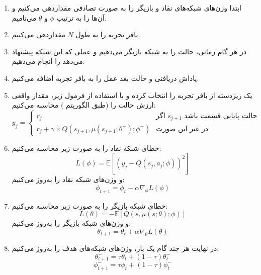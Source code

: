\begin{enumerate}
    \item ابتدا وزن‌های شبکه‌های نقاد و بازیگر را به صورت تصادفی مقداردهی می‌کنیم و آن‌ها را به ترتیب $\phi$ و $\theta$ می‌نامیم.
    \item بافر تجربه را به طول $N$ مقداردهی می‌کنیم.
    \item در هر گام زمانی، حالت را به شبکه بازیگر می‌دهیم و عملی که این شبکه پیشنهاد می‌دهد را انجام می‌دهیم.
    \item پاداش دریافتی و حالت بعد عمل را به بافر تجربه اضافه می‌کنیم.
    \item یک ریزدسته از بافر تجربه را انتخاب کرده و با استفاده از فرمول زیر، مقدار واقعی ارزش حالت را (طبق الگوریتم ) محاسبه می‌کنیم:
    \begin{equation}\label{ddpg_label}
        y_j = \begin{cases}
            r_j & \text{اگر $s_{j+1}$ حالت پایانی قسمت باشد} \\
            r_j + \gamma \times Q(s_{j+1}, \mu(s_{j+1}; \theta^-); \phi^-) & \text{در غیر این صورت}
        \end{cases}
    \end{equation}
    \item خطای شبکه نقاد را به صورت زیر محاسبه می‌کنیم:
    \begin{equation}\label{ddpg_critic_loss}
        L(\phi) = \mathbb{E}[(y_j - Q(s_j, a_j; \phi))^2]
    \end{equation}
    و وزن‌های شبکه نقاد را به‌روز می‌کنیم:
    \begin{equation}\label{ddpg_critic_update}
        \phi_{t+1} = \phi_t - \alpha \nabla_\phi L(\phi)
    \end{equation}
    \item خطای شبکه بازیگر را به صورت زیر محاسبه می‌کنیم:
    \begin{equation}\label{ddpg_actor_loss}
        L(\theta) = -\mathbb{E}[Q(s, \mu(s; \theta); \phi)]
    \end{equation}
    و وزن‌های شبکه بازیگر را به‌روز می‌کنیم:
    \begin{equation}\label{ddpg_actor_update}
        \theta_{t+1} = \theta_t + \alpha \nabla_\theta L(\theta)
    \end{equation}
    \item در نهایت هر چند گام یک بار، وزن‌های شبکه‌های هدف را به‌روز می‌کنیم:
    \begin{equation}\label{ddpg_target_actor_update}
        \theta^-_{t+1} = \tau \theta_t + (1-\tau) \theta^-_t
    \end{equation}
    \begin{equation}\label{ddpg_target_critic_update}
        \phi^-_{t+1} = \tau \phi_t + (1-\tau) \phi^-_t
    \end{equation}
\end{enumerate}
